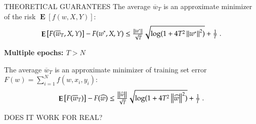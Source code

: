 \documentclass[final,t,serif,mathserif]{beamer}
\DeclareMathOperator*{\Exp}{\mathbf{E}}
\def\blockspaceb{\vspace{0.08cm}}
\begin{document}
\begin{frame}{}
\begin{columns}[t]
\begin{column}{.33\linewidth}
\begin{block}{THEORETICAL GUARANTEES}
	The average $\overline{w}_T$ is an approximate minimizer of the risk $\Exp[f(w,X,Y)]$:
	\[
	\Exp\left[F(\overline{w}_T,X,Y)\right] - F(w^*,X,Y) \leq \tfrac{\norm{w^*}}{\sqrt{T}} \sqrt{\log(1+4 T^2 \norm{w^*}^2)} +\tfrac{1}{T} \; .
	\]
	
	\vspace{1cm}
	
	\textbf{Multiple epochs: $T>N$}
	
	The average $\overline{w}_T$ is an approximate minimizer of training set error $F(w) = \sum_{i=1}^N f(w,x_i,y_i)$:
	\[
	\Exp\left[F(\overline{w}_T)\right] - F(\widehat{w}) \leq \tfrac{\norm{\widehat{w}}}{\sqrt{T}} \sqrt{\log(1+4 T^2 \norm{\widehat{w}}^2)} +\tfrac{1}{T} \; .
	\]
	
	\blockspaceb	
    \end{block}

    \begin{block}{DOES IT WORK FOR REAL?}
      \blockspaceb
      

\end{block}
\end{column}
\end{columns}
\end{frame}
\end{document}
